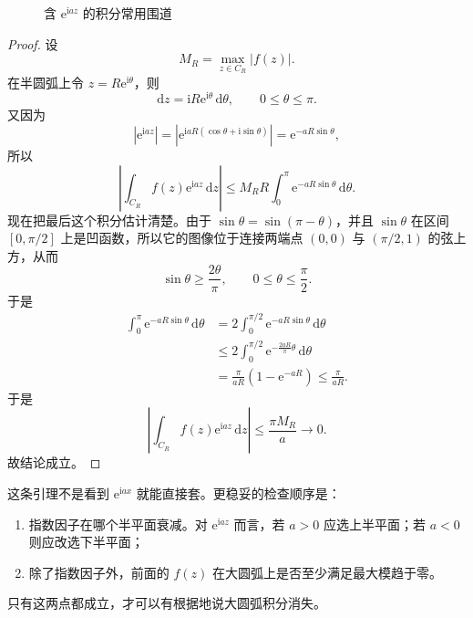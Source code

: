 \begin{figure}[htbp]
\centering
{}
\caption{含 $\mathrm{e}^{\mathrm{i}az}$ 的积分常用围道}
\label{fig:jordan-contour-ch05}
\end{figure}

\begin{proof}
设
\[
    M_R=\max_{z\in C_R}|f(z)|.
\]
在半圆弧上令 $z=R\mathrm{e}^{\mathrm{i}\theta}$，则
\[
    \mathrm{d}z=\mathrm{i}R\mathrm{e}^{\mathrm{i}\theta}\,\mathrm{d}\theta,
    \qquad 0\le \theta\le \pi.
\]
又因为
\[
    \left|\mathrm{e}^{\mathrm{i}az}\right|
    =
    \left|\mathrm{e}^{\mathrm{i}aR(\cos\theta+\mathrm{i}\sin\theta)}\right|
    =
    \mathrm{e}^{-aR\sin\theta},
\]
所以
\[
    \left|\int_{C_R} f(z)\mathrm{e}^{\mathrm{i}az}\,\mathrm{d}z\right|
    \le
    M_R R\int_0^\pi \mathrm{e}^{-aR\sin\theta}\,\mathrm{d}\theta.
\]
现在把最后这个积分估计清楚。由于 $\sin\theta=\sin(\pi-\theta)$，并且 $\sin\theta$ 在区间 $[0,\pi/2]$ 上是凹函数，所以它的图像位于连接两端点 $(0,0)$ 与 $(\pi/2,1)$ 的弦上方，从而
\[
    \sin\theta\ge \frac{2\theta}{\pi},
    \qquad 0\le \theta\le \frac{\pi}{2}.
\]
于是
\begin{align*}
    \int_0^\pi \mathrm{e}^{-aR\sin\theta}\,\mathrm{d}\theta
    &=
    2\int_0^{\pi/2} \mathrm{e}^{-aR\sin\theta}\,\mathrm{d}\theta \\
    &\le
    2\int_0^{\pi/2} \mathrm{e}^{-\frac{2aR}{\pi}\theta}\,\mathrm{d}\theta \\
    &=
    \frac{\pi}{aR}\left(1-\mathrm{e}^{-aR}\right)
    \le
    \frac{\pi}{aR}.
\end{align*}
于是
\[
    \left|\int_{C_R} f(z)\mathrm{e}^{\mathrm{i}az}\,\mathrm{d}z\right|
    \le
    \frac{\pi M_R}{a}\to 0.
\]
故结论成立。
\end{proof}

\begin{tishi}[使用约当引理前先检查什么]
这条引理不是看到 $\mathrm{e}^{\mathrm{i}ax}$ 就能直接套。更稳妥的检查顺序是：
\begin{enumerate}
    \item 指数因子在哪个半平面衰减。对 $\mathrm{e}^{\mathrm{i}az}$ 而言，若 $a>0$ 应选上半平面；若 $a<0$ 则应改选下半平面；
    \item 除了指数因子外，前面的 $f(z)$ 在大圆弧上是否至少满足最大模趋于零。
\end{enumerate}
只有这两点都成立，才可以有根据地说大圆弧积分消失。
\end{tishi}

